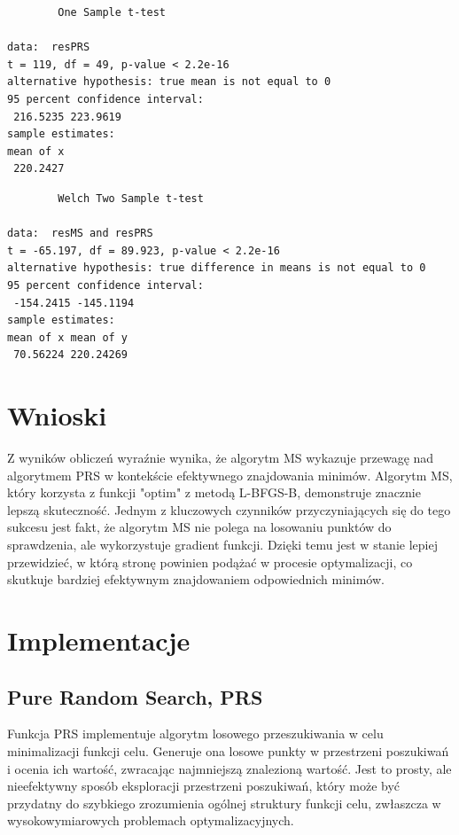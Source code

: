 \documentclass{article}
\begin{document}
\vspace{50pt}

\begin{verbatim}
        One Sample t-test

data:  resPRS
t = 119, df = 49, p-value < 2.2e-16
alternative hypothesis: true mean is not equal to 0
95 percent confidence interval:
 216.5235 223.9619
sample estimates:
mean of x
 220.2427
\end{verbatim}

\vspace{50pt}

\begin{verbatim}
        Welch Two Sample t-test

data:  resMS and resPRS
t = -65.197, df = 89.923, p-value < 2.2e-16
alternative hypothesis: true difference in means is not equal to 0
95 percent confidence interval:
 -154.2415 -145.1194
sample estimates:
mean of x mean of y
 70.56224 220.24269

\end{verbatim}


\newpage

\section{Wnioski}

\hspace{0.5cm} Z wyników obliczeń wyraźnie wynika, że algorytm MS wykazuje przewagę nad algorytmem PRS w kontekście efektywnego znajdowania minimów. Algorytm MS, który korzysta z funkcji "optim" z metodą L-BFGS-B, demonstruje znacznie lepszą skuteczność. Jednym z kluczowych czynników przyczyniających się do tego sukcesu jest fakt, że algorytm MS nie polega na losowaniu punktów do sprawdzenia, ale wykorzystuje gradient funkcji. Dzięki temu jest w stanie lepiej przewidzieć, w którą stronę powinien podążać w procesie optymalizacji, co skutkuje bardziej efektywnym znajdowaniem odpowiednich minimów.



\section{Implementacje}
\subsection{Pure Random Search, PRS}

\hspace{0.5cm} Funkcja PRS implementuje algorytm losowego przeszukiwania w celu minimalizacji funkcji celu. Generuje ona losowe punkty w przestrzeni poszukiwań i ocenia ich wartość, zwracając najmniejszą znalezioną wartość. Jest to prosty, ale nieefektywny sposób eksploracji przestrzeni poszukiwań, który może być przydatny do szybkiego zrozumienia ogólnej struktury funkcji celu, zwłaszcza w wysokowymiarowych problemach optymalizacyjnych.
\end{document}
